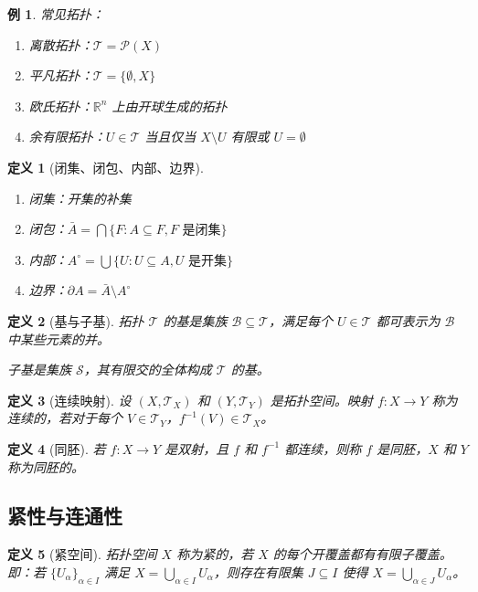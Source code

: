 \documentclass[12pt]{article}
\newtheorem{definition}{定义}[section]
\newtheorem{example}{例}[section]
\begin{document}
\begin{example}
常见拓扑：
\begin{enumerate}
\item 离散拓扑：$\mathcal{T} = \mathcal{P}(X)$
\item 平凡拓扑：$\mathcal{T} = \{\emptyset, X\}$
\item 欧氏拓扑：$\mathbb{R}^n$ 上由开球生成的拓扑
\item 余有限拓扑：$U \in \mathcal{T}$ 当且仅当 $X \setminus U$ 有限或 $U = \emptyset$
\end{enumerate}
\end{example}

\begin{definition}[闭集、闭包、内部、边界]
\begin{enumerate}
\item 闭集：开集的补集
\item 闭包：$\bar{A} = \bigcap\{F : A \subseteq F, F \text{ 是闭集}\}$
\item 内部：$A^\circ = \bigcup\{U : U \subseteq A, U \text{ 是开集}\}$
\item 边界：$\partial A = \bar{A} \setminus A^\circ$
\end{enumerate}
\end{definition}

\begin{definition}[基与子基]
拓扑 $\mathcal{T}$ 的基是集族 $\mathcal{B} \subseteq \mathcal{T}$，满足每个 $U \in \mathcal{T}$ 都可表示为 $\mathcal{B}$ 中某些元素的并。

子基是集族 $\mathcal{S}$，其有限交的全体构成 $\mathcal{T}$ 的基。
\end{definition}

\begin{definition}[连续映射]
设 $(X, \mathcal{T}_X)$ 和 $(Y, \mathcal{T}_Y)$ 是拓扑空间。映射 $f: X \to Y$ 称为连续的，若对于每个 $V \in \mathcal{T}_Y$，$f^{-1}(V) \in \mathcal{T}_X$。
\end{definition}

\begin{definition}[同胚]
若 $f: X \to Y$ 是双射，且 $f$ 和 $f^{-1}$ 都连续，则称 $f$ 是同胚，$X$ 和 $Y$ 称为同胚的。
\end{definition}

\subsection{紧性与连通性}

\begin{definition}[紧空间]
拓扑空间 $X$ 称为紧的，若 $X$ 的每个开覆盖都有有限子覆盖。即：若 $\{U_\alpha\}_{\alpha \in I}$ 满足 $X = \bigcup_{\alpha \in I} U_\alpha$，则存在有限集 $J \subseteq I$ 使得 $X = \bigcup_{\alpha \in J} U_\alpha$。
\end{definition}
\end{document}
